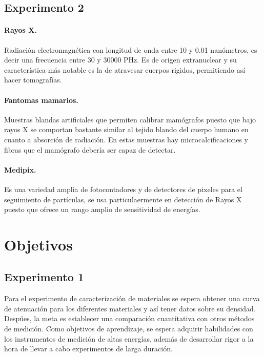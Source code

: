 \documentclass[notitlepage,letterpaper,12pt]{article} %
\begin{document}
\subsection{Experimento 2}
\paragraph{Rayos X.} Radiación electromagnética con longitud de onda entre 10 y 0.01 nanómetros, es decir una frecuencia entre 30 y 30000 PHz. Es de origen extranuclear y su característica más notable es la de atravesar cuerpos rigidos, permitiendo así hacer tomografías.
\paragraph{Fantomas mamarios.} Muestras blandas artificiales que permiten calibrar mamógrafos puesto que bajo rayos X se comportan bastante similar al tejido blando del cuerpo humano en cuanto a absorción de radiación. En estas muestras hay microcalcificaciones y fibras que el mamógrafo debería ser capaz de detectar.
\paragraph{Medipix.} Es una variedad amplia de fotocontadores y de detectores de pixeles para el seguimiento de partículas, se usa particulaermente en detección de Rayos X puesto que ofrece un rango amplio de sensitividad de energías\cite{medipix}.



\section{Objetivos}
\subsection{Experimento 1}
Para el experimento de caracterización de materiales se espera obtener una curva de atenuación para los diferentes materiales y así tener datos sobre su densidad. Despúes, la  meta es establecer una comparación cuantitativa con otros métodos de medición. Como objetivos de aprendizaje, se espera adquirir habilidades con los instrumentos de medición de altas energías, además de desarrollar rigor a la hora de llevar a cabo experimentos de larga duración. 

\end{document}
